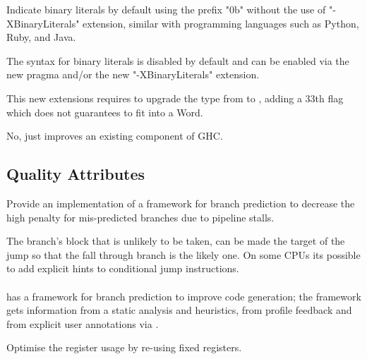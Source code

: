 \begin{wanted}
Indicate binary literals by default using the prefix "0b" without the use of "-XBinaryLiterals" extension, similar with programming languages such as Python, Ruby, and Java.
\end{wanted}

\begin{explication}
The syntax for binary literals is disabled by default and can be enabled via the new  pragma and/or the new "-XBinaryLiterals" extension.
\end{explication}

This new extensions requires to upgrade the  type from  to , adding a 33th flag which does not guarantees to fit into a Word.

\begin{new}
No, just improves an existing component of GHC.
\end{new}


\subsection{Quality Attributes}

\begin{qa}
Provide an implementation of a framework for branch prediction to decrease the high penalty for mis-predicted branches due to pipeline stalls.  \cite{wiki}
\end{qa}

\begin{design}
The branch's block that is unlikely to be taken, can be made the target of the jump so that the fall through branch is the likely one. On some CPUs its possible to add explicit hints to conditional jump instructions. 
\\\\
 has a framework for branch prediction to improve code generation; the framework gets information from a static analysis and heuristics, from profile feedback and from explicit user annotations via .
\end{design}

\begin{qa}
Optimise the register usage by re-using fixed registers.
\end{qa}

